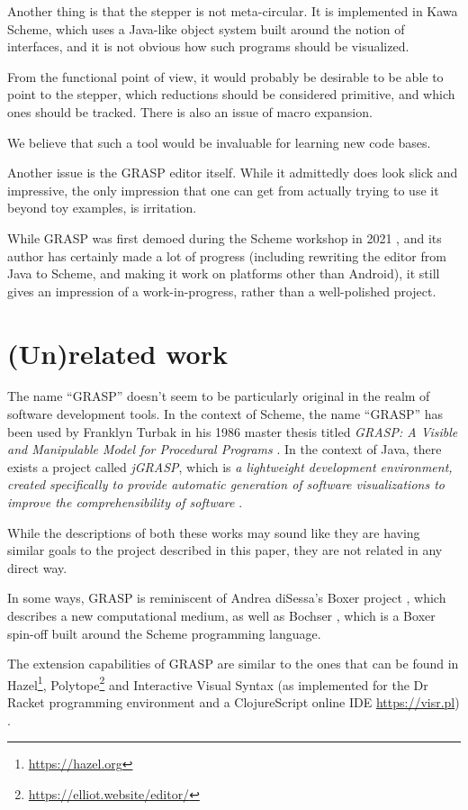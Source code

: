 \documentclass[acmsmall]{acmart}
\begin{document}
Another thing is that the stepper is not meta-circular. It is
implemented in Kawa Scheme, which uses a Java-like object system built
around the notion of interfaces, and it is not obvious how such
programs should be visualized.

From the functional point of view, it would probably be desirable to be
able to point to the stepper, which reductions should be considered
primitive, and which ones should be tracked. There is also an issue
of macro expansion.

We believe that such a tool would be invaluable for learning new
code bases.

Another issue is the GRASP editor itself. While it admittedly does
look slick and impressive, the only impression that one can get from
actually trying to use it beyond toy examples, is irritation.

While GRASP was first demoed during the Scheme workshop in
2021 \cite{Godek2021}, and its author has certainly made a lot of
progress (including rewriting the editor from Java to Scheme, and
making it work on platforms other than Android), it still gives an
impression of a work-in-progress, rather than a well-polished project.

\section{(Un)related work}

The name ``GRASP'' doesn't seem to be particularly original in the
realm of software development tools. In the context of Scheme, the
name ``GRASP'' has been used by Franklyn Turbak in his 1986 master
thesis titled \textit{GRASP: A Visible and Manipulable Model for
  Procedural Programs} \cite{Turbak}. In the context of Java, there
exists a project called \textit{jGRASP}, which is \textit{a
  lightweight development environment, created specifically to provide
  automatic generation of software visualizations to improve the
  comprehensibility of software} \cite{jGRASP}.

While the descriptions of both these works may sound like they are
having similar goals to the project described in this paper, they are
not related in any direct way.

In some ways, GRASP is reminiscent of Andrea diSessa's Boxer
project \cite{Boxer}, which describes a new computational medium, as
well as Bochser \cite{Bochser}, which is a Boxer spin-off built around
the Scheme programming language.

The extension capabilities of GRASP are similar to the ones that can
be found in Hazel\footnote{\url{https://hazel.org}},
Polytope\footnote{\url{https://elliot.website/editor/}} and
Interactive Visual Syntax (as implemented for the Dr Racket
programming environment and a ClojureScript online IDE
\url{https://visr.pl}) \cite{Andersen}.
\end{document}
